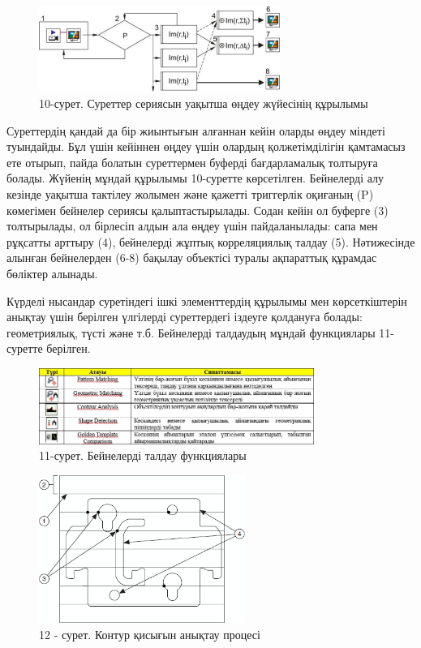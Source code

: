 \begin{figure}[H]
	\centering
	\includegraphics[width=0.7\textwidth]{media/ict2/image178}
	\caption*{10-сурет. Суреттер сериясын уақытша өңдеу жүйесінің құрылымы}
\end{figure}

\begin{multicols}{2}
Суреттердің қандай да бір жиынтығын алғаннан кейін оларды өңдеу міндеті
туындайды. Бұл үшін кейіннен өңдеу үшін олардың қолжетімділігін
қамтамасыз ете отырып, пайда болатын суреттермен буферді бағдарламалық
толтыруға болады. Жүйенің мұндай құрылымы 10-суретте көрсетілген.
Бейнелерді алу кезінде уақытша тактілеу жолымен және қажетті триггерлік
оқиғаның (P) көмегімен бейнелер сериясы қалыптастырылады. Содан кейін ол
буферге (3) толтырылады, ол бірлесіп алдын ала өңдеу үшін пайдаланылады:
сапа мен рұқсатты арттыру (4), бейнелерді жұптық корреляциялық талдау
(5). Нәтижесінде алынған бейнелерден (6-8) бақылау объектісі туралы
ақпараттық құрамдас бөліктер алынады.

Күрделі нысандар суретіндегі ішкі элементтердің құрылымы мен
көрсеткіштерін анықтау үшін берілген үлгілерді суреттердегі іздеуге
қолдануға болады: геометриялық, түсті және т.б. Бейнелерді талдаудың
мұндай функциялары 11-суретте берілген.
\end{multicols}

\begin{figure}[H]
	\centering
	\includegraphics[width=0.8\textwidth]{media/ict2/image179}
	\caption*{11-сурет. Бейнелерді талдау функциялары}
\end{figure}

\begin{figure}[H]
	\centering
	\includegraphics[width=0.6\textwidth]{media/ict2/image180}
	\caption*{12 - сурет. Контур қисығын анықтау процесі}
\end{figure}

